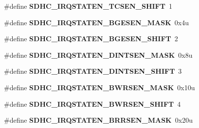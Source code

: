 \begin{DoxyCompactItemize}
\item 
\#define {\bfseries S\+D\+H\+C\+\_\+\+I\+R\+Q\+S\+T\+A\+T\+E\+N\+\_\+\+T\+C\+S\+E\+N\+\_\+\+S\+H\+I\+FT}~1\hypertarget{group__SDHC__Register__Masks_gae491cb6cce5060d01d37d180b32ac94c}{}\label{group__SDHC__Register__Masks_gae491cb6cce5060d01d37d180b32ac94c}

\item 
\#define {\bfseries S\+D\+H\+C\+\_\+\+I\+R\+Q\+S\+T\+A\+T\+E\+N\+\_\+\+B\+G\+E\+S\+E\+N\+\_\+\+M\+A\+SK}~0x4u\hypertarget{group__SDHC__Register__Masks_ga46d5c9b348b825831e0fb397ede43a9a}{}\label{group__SDHC__Register__Masks_ga46d5c9b348b825831e0fb397ede43a9a}

\item 
\#define {\bfseries S\+D\+H\+C\+\_\+\+I\+R\+Q\+S\+T\+A\+T\+E\+N\+\_\+\+B\+G\+E\+S\+E\+N\+\_\+\+S\+H\+I\+FT}~2\hypertarget{group__SDHC__Register__Masks_ga6fa2e791021ce11cf32108b91c82ba6e}{}\label{group__SDHC__Register__Masks_ga6fa2e791021ce11cf32108b91c82ba6e}

\item 
\#define {\bfseries S\+D\+H\+C\+\_\+\+I\+R\+Q\+S\+T\+A\+T\+E\+N\+\_\+\+D\+I\+N\+T\+S\+E\+N\+\_\+\+M\+A\+SK}~0x8u\hypertarget{group__SDHC__Register__Masks_ga3e226429fe18b447810a75373b0e4e80}{}\label{group__SDHC__Register__Masks_ga3e226429fe18b447810a75373b0e4e80}

\item 
\#define {\bfseries S\+D\+H\+C\+\_\+\+I\+R\+Q\+S\+T\+A\+T\+E\+N\+\_\+\+D\+I\+N\+T\+S\+E\+N\+\_\+\+S\+H\+I\+FT}~3\hypertarget{group__SDHC__Register__Masks_ga7a2afc379b13fa392c324274ccf3c313}{}\label{group__SDHC__Register__Masks_ga7a2afc379b13fa392c324274ccf3c313}

\item 
\#define {\bfseries S\+D\+H\+C\+\_\+\+I\+R\+Q\+S\+T\+A\+T\+E\+N\+\_\+\+B\+W\+R\+S\+E\+N\+\_\+\+M\+A\+SK}~0x10u\hypertarget{group__SDHC__Register__Masks_gab61d7d78bdcc89f1ae03332eae100736}{}\label{group__SDHC__Register__Masks_gab61d7d78bdcc89f1ae03332eae100736}

\item 
\#define {\bfseries S\+D\+H\+C\+\_\+\+I\+R\+Q\+S\+T\+A\+T\+E\+N\+\_\+\+B\+W\+R\+S\+E\+N\+\_\+\+S\+H\+I\+FT}~4\hypertarget{group__SDHC__Register__Masks_ga8d3fbb4324645ec6117b77a592000680}{}\label{group__SDHC__Register__Masks_ga8d3fbb4324645ec6117b77a592000680}

\item 
\#define {\bfseries S\+D\+H\+C\+\_\+\+I\+R\+Q\+S\+T\+A\+T\+E\+N\+\_\+\+B\+R\+R\+S\+E\+N\+\_\+\+M\+A\+SK}~0x20u\hypertarget{group__SDHC__Register__Masks_ga158351e2d7c3b799b7e1de2231b2721e}{}\label{group__SDHC__Register__Masks_ga158351e2d7c3b799b7e1de2231b2721e}


\end{DoxyCompactItemize}

